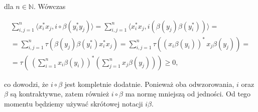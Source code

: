 dla $n \in \mathbb{N}$.
Wówczas
\begin{linenomath*}
 \begin{multline}
\sum \limits_{i, j =1}^{n}
\langle x_{i}^{*} x_{j}, i \circ \beta(y_{i}^{*} y_{j}) \rangle =
\sum \limits_{i, j =1}^{n}
\langle x_{i}^{*} x_{j}, i ( \beta( y_{j}) \beta(y_{i}^{*})) \rangle = \\
=\sum \limits_{i, j =1}^{n}
\tau \left(\beta( y_{j}) \beta(y_{i}^{*}) x_{i}^{*} x_{j}\right) =
\sum \limits_{i, j =1}^{n} \tau \left( (x_{i} \beta(y_{i}) )^{*} \,  x_{j} \beta( y_{j})
\right) =\\
= \tau \left( \
\left( \sum \limits_{i=1}^{n} x_{i} \beta(y_{i}) \right)^{*}
\left( \sum \limits_{j=1}^{n} x_{j} \beta(y_{j}) \right)\right ) \geq 0,
 \end{multline}
\end{linenomath*}
co dowodzi, że $i \circ \beta$ jest kompletnie dodatnie.
Ponieważ oba odwzorowania, $i$ oraz $\beta$ są kontraktywne,
zatem również $i\circ\beta$ ma normę mniejszą od jedności.
Od tego momentu będziemy używać skrótowej notacji $i\beta$.

